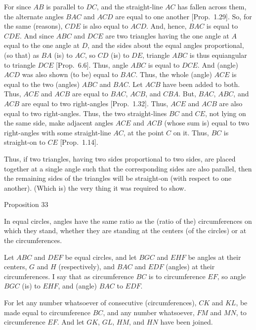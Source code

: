 For since $AB$ is parallel to $DC$, and the straight-line $AC$ has fallen across them, the alternate angles $BAC$ and $ACD$ are equal to one another  [Prop.~1.29]. So, for the same (reasons), $CDE$ is also equal to $ACD$. 
And, hence, $BAC$ is equal to $CDE$. And since $ABC$ and $DCE$ are two triangles
having the one angle at $A$ equal to the one angle at $D$, and the sides about the
equal angles proportional, (so that) as $BA$ (is) to $AC$, so $CD$ (is) to $DE$, triangle $ABC$ is thus equiangular to triangle $DCE$ [Prop.~6.6].  Thus, angle $ABC$ is equal to $DCE$.
And (angle) $ACD$ was also shown (to be) equal to $BAC$. Thus, the whole
(angle) $ACE$ is equal to the two (angles) $ABC$ and $BAC$. Let $ACB$ have
been added to both. Thus, $ACE$ and $ACB$ are equal to $BAC$, $ACB$,  and
$CBA$. But, $BAC$, $ABC$, and $ACB$ are equal to two right-angles  [Prop.~1.32]. Thus, $ACE$ and $ACB$ are also equal to two right-angles.
Thus, the two straight-lines $BC$ and $CE$, not lying on the same side, 
make  adjacent angles $ACE$ and $ACB$ (whose sum is) equal to two right-angles with some straight-line $AC$,  at the
point $C$ on it. Thus, $BC$ is straight-on to
$CE$  [Prop.~1.14].

Thus, if  two triangles,
having two sides proportional to two sides, are placed together at a single angle such that the corresponding 
sides are also parallel, then the remaining sides of the triangles will
be straight-on (with respect to one another). (Which is) the very thing it
was required to show.


\begin{center}
{\large Proposition 33}
\end{center}

In equal circles,  angles have the same ratio
as the (ratio of the) circumferences on which they stand, whether they are standing at
the centers (of the circles) or at the circumferences.

\epsfysize=1.5in
\centerline{}

Let $ABC$ and $DEF$ be equal circles, and let $BGC$ and $EHF$ be angles
at their centers, $G$ and $H$ (respectively), and $BAC$ and $EDF$ (angles)
at their circumferences. I say that as circumference $BC$ is to circumference
$EF$, so angle $BGC$ (is) to $EHF$, and (angle) $BAC$ to $EDF$.

For let any number whatsoever of consecutive (circumferences), $CK$ and
$KL$, be made equal to circumference $BC$, and any number whatsoever, $FM$ and $MN$, to circumference $EF$. And let $GK$, $GL$, $HM$, and $HN$ have been
joined.

